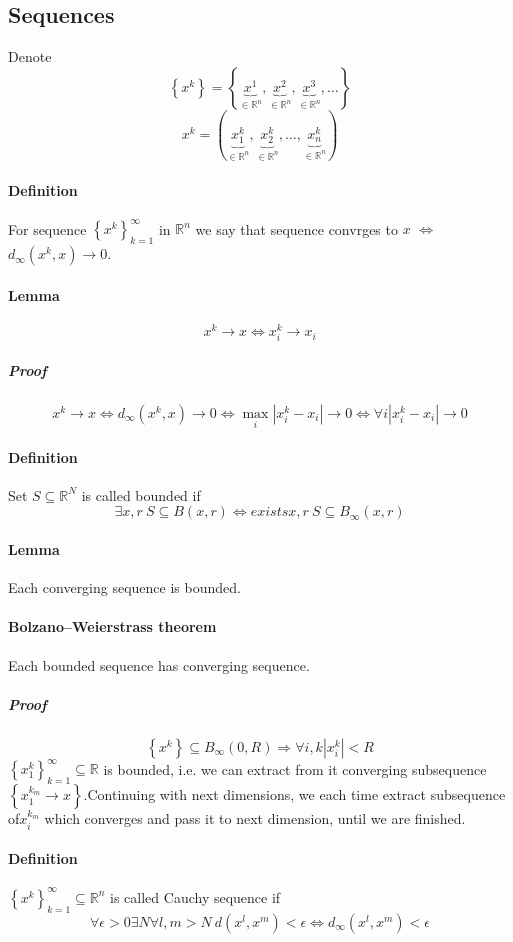 \subsection{Sequences}
Denote
$$\left\{ x^k \right\} = \left\{ \underbrace{x^1}_{\in \mathbb{R}^n},\underbrace{x^2}_{\in \mathbb{R}^n},\underbrace{x^3}_{\in \mathbb{R}^n},\dots \right\}$$
$$x^k = \left( \underbrace{x_1^k}_{\in \mathbb{R}^n}, \underbrace{x_2^k}_{\in \mathbb{R}^n}, \dots, \underbrace{x_n^k}_{\in \mathbb{R}^n}\right)$$
\paragraph{Definition}
For sequence $\left\{ x^k \right\}_{k=1}^\infty$ in $\mathbb{R}^n$ we say that sequence convrges to $x$ $\iff$ $d_\infty(x^k,x) \to 0$.
\paragraph{Lemma}
$$x^k \to x \iff x_i^k \to x_i$$
\subparagraph{Proof}
$$x^k \to x \iff d_\infty(x^k,x) \to 0 \iff  \max\limits_i \left|x^k_i - x_i\right| \to 0 \iff \forall i \left|x^k_i - x_i\right| \to 0 $$  
\paragraph{Definition}
Set $S \subseteq \mathbb{R}^N$ is called bounded if $$\exists x,r \: S \subseteq B(x,r) \iff exists x,r \: S \subseteq B_\infty(x,r)$$
\paragraph{Lemma} Each converging sequence is bounded.
\paragraph{Bolzano–Weierstrass theorem} Each bounded sequence has converging sequence.
\subparagraph{Proof}
$$\left\{ x^k \right\} \subseteq B_\infty (0,R) \Rightarrow \forall i,k |x^k_i| < R$$
 $\left\{ x_1^k \right\}_{k=1}^\infty \subseteq \mathbb{R}$ is bounded, i.e. we can extract from it converging subsequence $\left\{ x^{k_m}_1 \to x \right\}$.Continuing with next dimensions, we each time extract subsequence of$x^{k_m}_i$ which converges and pass it to next dimension, until we are finished.
 \paragraph{Definition}
 $\left\{  x^k \right\}_{k=1}^\infty \subseteq \mathbb{R}^n$ is called Cauchy sequence if 
 $$\forall \epsilon> 0 \exists N \forall l,m > N \: d(x^l, x^m) < \epsilon \iff d_\infty(x^l, x^m) < \epsilon$$

